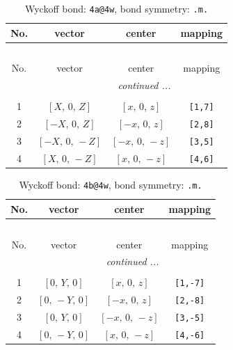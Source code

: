 \documentclass[fleqn,8pt]{jsarticle}
\begin{document}
\begin{longtable}{cccc}
\caption{Wyckoff bond: {\tt 4a@4w}, bond symmetry: {\tt .m.}}
 \\
 \hline \hline
No. & vector & center & mapping \\ \hline \endfirsthead

\multicolumn{3}{l}{\tablename\ \thetable{}} \\
 \hline \hline
No. & vector & center & mapping \\ \hline \endhead

 \hline \hline
\multicolumn{3}{r}{\footnotesize\it continued ...} \\ \endfoot

 \hline \hline
\multicolumn{3}{r}{} \\ \endlastfoot

1 & $\left[ X,\, 0,\, Z \right]$ & $\left[ x,\, 0,\, z \right]$ & {\tt [1,7]} \\ \hline
2 & $\left[ - X,\, 0,\, Z \right]$ & $\left[ - x,\, 0,\, z \right]$ & {\tt [2,8]} \\ \hline
3 & $\left[ - X,\, 0,\, - Z \right]$ & $\left[ - x,\, 0,\, - z \right]$ & {\tt [3,5]} \\ \hline
4 & $\left[ X,\, 0,\, - Z \right]$ & $\left[ x,\, 0,\, - z \right]$ & {\tt [4,6]} \\
\end{longtable}
\renewcommand{\arraystretch}{1.2}
\begin{longtable}{cccc}
\caption{Wyckoff bond: {\tt 4b@4w}, bond symmetry: {\tt .m.}}
 \\
 \hline \hline
No. & vector & center & mapping \\ \hline \endfirsthead

\multicolumn{3}{l}{\tablename\ \thetable{}} \\
 \hline \hline
No. & vector & center & mapping \\ \hline \endhead

 \hline \hline
\multicolumn{3}{r}{\footnotesize\it continued ...} \\ \endfoot

 \hline \hline
\multicolumn{3}{r}{} \\ \endlastfoot

1 & $\left[ 0,\, Y,\, 0 \right]$ & $\left[ x,\, 0,\, z \right]$ & {\tt [1,-7]} \\ \hline
2 & $\left[ 0,\, - Y,\, 0 \right]$ & $\left[ - x,\, 0,\, z \right]$ & {\tt [2,-8]} \\ \hline
3 & $\left[ 0,\, Y,\, 0 \right]$ & $\left[ - x,\, 0,\, - z \right]$ & {\tt [3,-5]} \\ \hline
4 & $\left[ 0,\, - Y,\, 0 \right]$ & $\left[ x,\, 0,\, - z \right]$ & {\tt [4,-6]} \\
\end{longtable}
\end{document}
